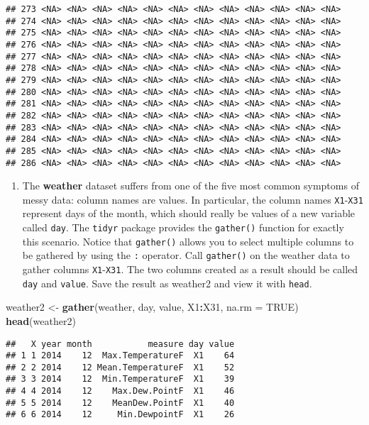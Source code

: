 \documentclass[]{article}
\newenvironment{Shaded}{\begin{snugshade}}{\end{snugshade}}
\newcommand{\KeywordTok}[1]{\textcolor[rgb]{0.13,0.29,0.53}{\textbf{#1}}}
\newcommand{\DataTypeTok}[1]{\textcolor[rgb]{0.13,0.29,0.53}{#1}}
\newcommand{\StringTok}[1]{\textcolor[rgb]{0.31,0.60,0.02}{#1}}
\newcommand{\OtherTok}[1]{\textcolor[rgb]{0.56,0.35,0.01}{#1}}
\newcommand{\OperatorTok}[1]{\textcolor[rgb]{0.81,0.36,0.00}{\textbf{#1}}}
\newcommand{\NormalTok}[1]{#1}
\providecommand{\tightlist}{%
  \setlength{\itemsep}{0pt}\setlength{\parskip}{0pt}}
\begin{document}
\begin{verbatim}
## 273 <NA> <NA> <NA> <NA> <NA> <NA> <NA> <NA> <NA> <NA> <NA> <NA>
## 274 <NA> <NA> <NA> <NA> <NA> <NA> <NA> <NA> <NA> <NA> <NA> <NA>
## 275 <NA> <NA> <NA> <NA> <NA> <NA> <NA> <NA> <NA> <NA> <NA> <NA>
## 276 <NA> <NA> <NA> <NA> <NA> <NA> <NA> <NA> <NA> <NA> <NA> <NA>
## 277 <NA> <NA> <NA> <NA> <NA> <NA> <NA> <NA> <NA> <NA> <NA> <NA>
## 278 <NA> <NA> <NA> <NA> <NA> <NA> <NA> <NA> <NA> <NA> <NA> <NA>
## 279 <NA> <NA> <NA> <NA> <NA> <NA> <NA> <NA> <NA> <NA> <NA> <NA>
## 280 <NA> <NA> <NA> <NA> <NA> <NA> <NA> <NA> <NA> <NA> <NA> <NA>
## 281 <NA> <NA> <NA> <NA> <NA> <NA> <NA> <NA> <NA> <NA> <NA> <NA>
## 282 <NA> <NA> <NA> <NA> <NA> <NA> <NA> <NA> <NA> <NA> <NA> <NA>
## 283 <NA> <NA> <NA> <NA> <NA> <NA> <NA> <NA> <NA> <NA> <NA> <NA>
## 284 <NA> <NA> <NA> <NA> <NA> <NA> <NA> <NA> <NA> <NA> <NA> <NA>
## 285 <NA> <NA> <NA> <NA> <NA> <NA> <NA> <NA> <NA> <NA> <NA> <NA>
## 286 <NA> <NA> <NA> <NA> <NA> <NA> <NA> <NA> <NA> <NA> <NA> <NA>
\end{verbatim}

\begin{enumerate}
\def\labelenumi{\arabic{enumi}.}
\setcounter{enumi}{2}
\tightlist
\item
  The \textbf{weather} dataset suffers from one of the five most common
  symptoms of messy data: column names are values. In particular, the
  column names \texttt{X1}-\texttt{X31} represent days of the month,
  which should really be values of a new variable called \texttt{day}.
  The \texttt{tidyr} package provides the \texttt{gather()} function for
  exactly this scenario. Notice that \texttt{gather()} allows you to
  select multiple columns to be gathered by using the \texttt{:}
  operator. Call \texttt{gather()} on the weather data to gather columns
  \texttt{X1}-\texttt{X31}. The two columns created as a result should
  be called \texttt{day} and \texttt{value}. Save the result as weather2
  and view it with \texttt{head}.
\end{enumerate}

\begin{Shaded}
\begin{Highlighting}[]
\NormalTok{weather2 <-}\StringTok{ }\KeywordTok{gather}\NormalTok{(weather, day, value, X1}\OperatorTok{:}\NormalTok{X31, }\DataTypeTok{na.rm =} \OtherTok{TRUE}\NormalTok{)}
\KeywordTok{head}\NormalTok{(weather2)}
\end{Highlighting}
\end{Shaded}

\begin{verbatim}
##   X year month           measure day value
## 1 1 2014    12  Max.TemperatureF  X1    64
## 2 2 2014    12 Mean.TemperatureF  X1    52
## 3 3 2014    12  Min.TemperatureF  X1    39
## 4 4 2014    12    Max.Dew.PointF  X1    46
## 5 5 2014    12    MeanDew.PointF  X1    40
## 6 6 2014    12     Min.DewpointF  X1    26
\end{verbatim}
\end{document}
